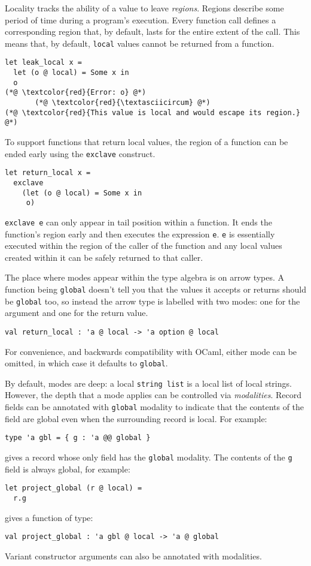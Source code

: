 \documentclass[acmsmall, screen, nonacm]{acmart}
\theoremstyle{definition}
\begin{document}
Locality tracks the ability of a value to leave \emph{regions}.  Regions
describe some period of time during a program's execution. Every
function call defines a corresponding region that, by default, lasts for
the entire extent of the call. This means that, by default,
\lstinline[style=oxcaml]{local} values cannot be returned from a
function.
\begin{lstlisting}[style=oxcaml]
let leak_local x =
  let (o @ local) = Some x in
  o
(*@ \textcolor{red}{Error: o} @*)
       (*@ \textcolor{red}{\textasciicircum} @*)
(*@ \textcolor{red}{This value is local and would escape its region.} @*)
\end{lstlisting}

To support functions that return local values, the region of a function
can be ended early using the \lstinline[style=oxcaml]{exclave} construct.
\begin{lstlisting}[style=oxcaml]
let return_local x =
  exclave
    (let (o @ local) = Some x in
     o)
\end{lstlisting}
\lstinline[style=oxcaml]{exclave e} can only appear in tail position
within a function.  It ends the function's region early and then
executes the expression
\lstinline[style=oxcaml]{e}. \lstinline[style=oxcaml]{e} is essentially
executed within the region of the caller of the function and any local
values created within it can be safely returned to that caller.

The place where modes appear within the type algebra is on arrow
types. A function being \lstinline[style=oxcaml]{global} doesn't tell you
that the values it accepts or returns should be
\lstinline[style=oxcaml]{global} too, so instead the arrow type is
labelled with two modes: one for the argument and one for the return
value.
\begin{lstlisting}[style=oxcaml]
val return_local : 'a @ local -> 'a option @ local
\end{lstlisting}
For convenience, and backwards compatibility with OCaml, either mode can
be omitted, in which case it defaults to
\lstinline[style=oxcaml]{global}.

By default, modes are deep: a local \lstinline[style=oxcaml]{string list}
is a local list of local strings. However, the depth that a mode applies
can be controlled via \emph{modalities}. Record fields can be annotated
with \lstinline[style=oxcaml]{global} modality to indicate that the
contents of the field are global even when the surrounding record is
local. For example:
\begin{lstlisting}[style=oxcaml]
type 'a gbl = { g : 'a @@ global }
\end{lstlisting}
gives a record whose only field has the \lstinline[style=oxcaml]{global}
modality. The contents of the \lstinline[style=oxcaml]{g} field is always
global, for example:
\begin{lstlisting}[style=oxcaml]
let project_global (r @ local) =
  r.g
\end{lstlisting}
gives a function of type:
\begin{lstlisting}[style=oxcaml]
val project_global : 'a gbl @ local -> 'a @ global
\end{lstlisting}
Variant constructor arguments can also be annotated with modalities.
\end{document}
